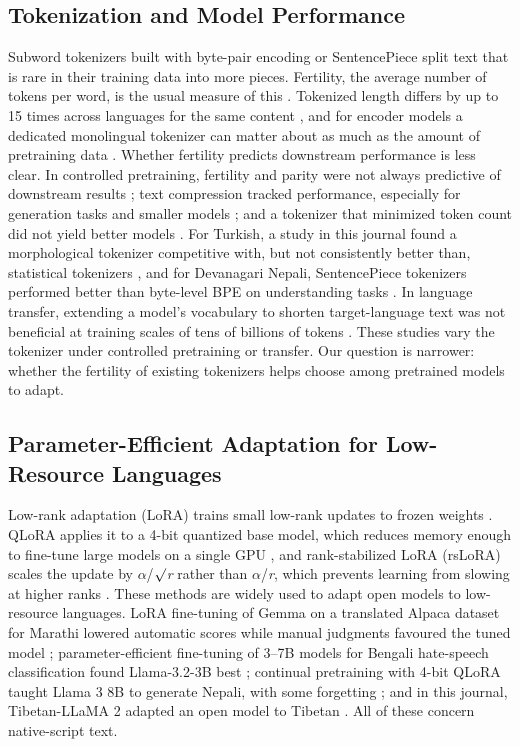 \documentclass{article}
\begin{document}
\subsection{Tokenization and Model Performance}

Subword tokenizers built with byte-pair encoding or SentencePiece \citep{sennrich2016,kudo2018} split text that is rare in their training data into more pieces. Fertility, the average number of tokens per word, is the usual measure of this \citep{rust2021}. Tokenized length differs by up to 15 times across languages for the same content \citep{petrov2023}, and for encoder models a dedicated monolingual tokenizer can matter about as much as the amount of pretraining data \citep{rust2021}. Whether fertility predicts downstream performance is less clear. In controlled pretraining, fertility and parity were not always predictive of downstream results \citep{ali2024}; text compression tracked performance, especially for generation tasks and smaller models \citep{goldman2024}; and a tokenizer that minimized token count did not yield better models \citep{schmidt2024}. For Turkish, a study in this journal found a morphological tokenizer competitive with, but not consistently better than, statistical tokenizers \citep{toraman2023}, and for Devanagari Nepali, SentencePiece tokenizers performed better than byte-level BPE on understanding tasks \citep{luitel2025}. In language transfer, extending a model's vocabulary to shorten target-language text was not beneficial at training scales of tens of billions of tokens \citep{zhao2024}. These studies vary the tokenizer under controlled pretraining or transfer. Our question is narrower: whether the fertility of existing tokenizers helps choose among pretrained models to adapt.

\subsection{Parameter-Efficient Adaptation for Low-Resource Languages}

Low-rank adaptation (LoRA) trains small low-rank updates to frozen weights \citep{hu2022}. QLoRA applies it to a 4-bit quantized base model, which reduces memory enough to fine-tune large models on a single GPU \citep{dettmers2023}, and rank-stabilized LoRA (rsLoRA) scales the update by $\alpha$/$\surd$\emph{r} rather than $\alpha$/\emph{r}, which prevents learning from slowing at higher ranks \citep{kalajdzievski2023}. These methods are widely used to adapt open models to low-resource languages. LoRA fine-tuning of Gemma on a translated Alpaca dataset for Marathi lowered automatic scores while manual judgments favoured the tuned model \citep{khade2025}; parameter-efficient fine-tuning of 3–7B models for Bengali hate-speech classification found Llama-3.2-3B best \citep{islam2025}; continual pretraining with 4-bit QLoRA taught Llama 3 8B to generate Nepali, with some forgetting \citep{duwal2025}; and in this journal, Tibetan-LLaMA 2 adapted an open model to Tibetan \citep{sha2025}. All of these concern native-script text.
\end{document}

